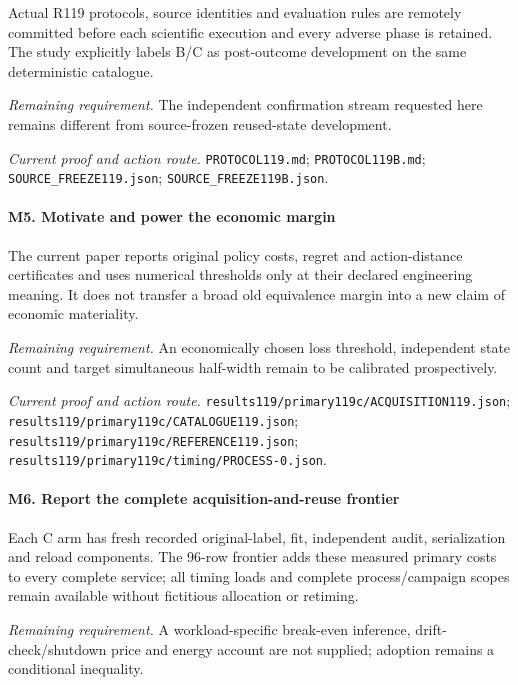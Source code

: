 Actual R119 protocols, source identities and evaluation rules are remotely committed before each scientific execution and every adverse phase is retained. The study explicitly labels B/\allowbreak{}C as post-outcome development on the same deterministic catalogue.

\par\emph{Remaining requirement.} The independent confirmation stream requested here remains different from source-frozen reused-state development.

\par\emph{Current proof and action route.} \nolinkurl{PROTOCOL119.md}; \nolinkurl{PROTOCOL119B.md}; \nolinkurl{SOURCE_FREEZE119.json}; \nolinkurl{SOURCE_FREEZE119B.json}.

\paragraph{M5. Motivate and power the economic margin}

The current paper reports original policy costs, regret and action-distance certificates and uses numerical thresholds only at their declared engineering meaning. It does not transfer a broad old equivalence margin into a new claim of economic materiality.

\par\emph{Remaining requirement.} An economically chosen loss threshold, independent state count and target simultaneous half-width remain to be calibrated prospectively.

\par\emph{Current proof and action route.} \nolinkurl{results119/primary119c/ACQUISITION119.json}; \nolinkurl{results119/primary119c/CATALOGUE119.json}; \nolinkurl{results119/primary119c/REFERENCE119.json}; \nolinkurl{results119/primary119c/timing/PROCESS-0.json}.

\paragraph{M6. Report the complete acquisition-and-reuse frontier}

Each C arm has fresh recorded original-label, fit, independent audit, serialization and reload components. The 96-row frontier adds these measured primary costs to every complete service; all timing loads and complete process/\allowbreak{}campaign scopes remain available without fictitious allocation or retiming.

\par\emph{Remaining requirement.} A workload-specific break-even inference, drift-check/\allowbreak{}shutdown price and energy account are not supplied; adoption remains a conditional inequality.

